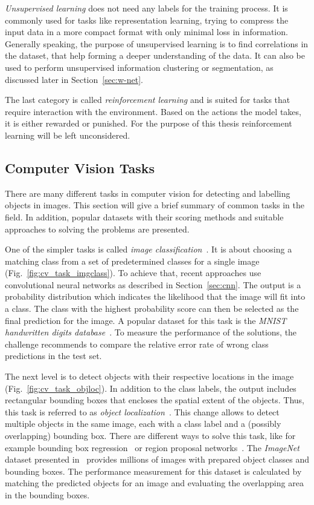 \emph{Unsupervised learning} does not need any labels for the training process. It is commonly used for tasks like representation learning, trying to compress the input data in a more compact format with only minimal loss in information. Generally speaking, the purpose of unsupervised learning is to find correlations in the dataset, that help forming a deeper understanding of the data. It can also be used to perform unsupervised information clustering or segmentation, as discussed later in Section~\ref{sec:w-net}.

The last category is called \emph{reinforcement learning} and is suited for tasks that require interaction with the environment. Based on the actions the model takes, it is either rewarded or punished. For the purpose of this thesis reinforcement learning will be left unconsidered.

\subsection{Computer Vision Tasks}
There are many different tasks in computer vision for detecting and labelling objects in images. This section will give a brief summary of common tasks in the field. In addition, popular datasets with their scoring methods and suitable approaches to solving the problems are presented.

One of the simpler tasks is called \emph{image classification}~\cite[p.~98]{DLbook16}. It is about choosing a matching class from a set of predetermined classes for a single image (Fig.~\ref{fig:cv_task_imgclass}). To achieve that, recent approaches use convolutional neural networks as described in Section~\ref{sec:cnn}. The output is a probability distribution which indicates the likelihood that the image will fit into a class. The class with the highest probability score can then be selected as the final prediction for the image. A popular dataset for this task is the \emph{MNIST handwritten digits database}~\cite{mnist10}. To measure the performance of the solutions, the challenge recommends to compare the relative error rate of wrong class predictions in the test set.

The next level is to detect objects with their respective locations in the image (Fig.~\ref{fig:cv_task_objloc}). In addition to the class labels, the output includes rectangular bounding boxes that encloses the spatial extent of the objects. Thus, this task is referred to as \emph{object localization}~\cite{rcnn14}. This change allows to detect multiple objects in the same image, each with a class label and a (possibly overlapping) bounding box. There are different ways to solve this task, like for example bounding box regression~\cite{obj_detection13} or region proposal networks~\cite{ff-rcnn17}. The \emph{ImageNet} dataset presented in~\cite{imgnet09} provides millions of images with prepared object classes and bounding boxes. The performance measurement for this dataset is calculated by matching the predicted objects for an image and evaluating the overlapping area in the bounding boxes.

